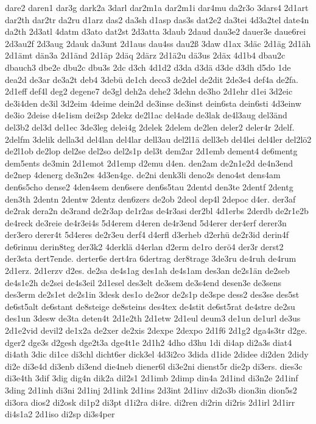{dare2
daren1
dar3g
dark2a
3darl
dar2m1a
dar2m1i
dar4mu
da2r3o
3dars4
2d1art
dar2th
dar2tr
da2ru
d1arz
das2
da3sh
d1asp
das3s
dat2e2
da3tei
4d3a2tel
date4n
da2th
2d3atl
4datm
d3ato
dat2st
2d3atta
3daub
2daud
dau3e2
dauer3e
daue6rei
2d3au2f
2d3aug
2dauk
da3unt
2d1aus
dau4ss
dau2ß
3daw
d1ax
3däc
2d1äg
2d1äh
2d1ämt
dän3a
2d1änd
2d1äp
2däq
2därz
2d1ä2u
dä3us
2däx
4d1b4
dbau2c
dbauch3
dbe2e
dbu2c
dbu3s
2dc
d3ch
4d1d2
d3da
d3dä
d3de
d3dh
d5do
1de
dea2d
de3ar
de3a2t
deb4
3debü
de1ch
deco3
de2del
de2dit
2de3e4
def4a
de2fa.
2d1eff
def4l
deg2
degene7
de3gl
deh2a
dehe2
3dehn
de3ho
2d1ehr
d1ei
3d2eic
de3i4den
de3il
3d2eim
4deime
dein2d
de3inse
de3inst
dein6sta
dein6sti
4d3einw
de3io
2deise
d4e1ism
dei2sp
2dekz
de2l1ac
del4ade
de3lak
de4l3aug
del3änd
del3b2
del3d
del1ec
3de3leg
delei4g
2delek
2delem
de2len
deler2
deler4r
2delf.
2delfm
3delik
della3d
del4lan
del4lar
dell3au
del2l1ä
dell3eb
del4lei
del4ler
del2lö2
de2l1ob
de2lop
del2se
del2so
del2s1p
del3t
dem2ar
2d1emb
dement4
de6mentg
dem5ents
de3min
2d1emot
2d1emp
d2emu
d4en.
den2am
de2n1e2d
de4n3end
de2nep
4denerg
de3n2es
4d3en4ge.
de2ni
denk3li
deno2s
deno4st
dens4am
den6s5cho
dense2
4den4sem
den6sere
den6s5tau
2dentd
den3te
2dentf
2dentg
den3th
2dentn
2dentw
2dentz
den6zers
de2ob
2deol
dep4l
2depoc
d4er.
der3af
de2rak
dera2n
de3rand
de2r3ap
de1r2as
de4r3asi
der2bl
4d1erbs
2derdb
de2r1e2b
de4reck
de3reie
de4r3ei4s
5d4erem
d4eren
de4r3end
5d4erer
der4erf
derer3n
der3ero
derer4t
5d4eres
de2r3eu
derf4
d4erfl
d3erheb
d2erhü
de2r3id
derin4f
de6rinnu
derin8teg
der3k2
4derklä
d4erlan
d2erm
de1ro
derö4
der3r
derst2
der3sta
dert7ende.
derter6e
dert4ra
6dertrag
der8trage
3de3ru
de4ruh
de4rum
2d1erz.
2d1erzv
d2es.
de2sa
de4s1ag
des1ah
de4s1am
des3an
de2s1än
de2seb
de4s1e2h
de2sei
de4s3eil
2d1esel
des3elt
de3sem
de3s4end
desen3e
de3sens
des3erm
de2s1et
de2s1in
3desk
des1o
de2sor
de2s1p
de3spe
dess2
des3se
des5st
de6st5alt
de6stant
de8steige
de8steins
des4tex
de4stit
de6st5rat
de4stre
de2su
des1un
3desw
de3ta
deten4t
2d1e2th
2d1etw
2d1eul
deum3
de1un
de1url
de3us
2d1e2vid
devil2
de1x2a
de2xer
de2xis
2dexpe
2dexpo
2d1f6
2d1g2
dga4s3tr
d2ge.
dger2
dge3s
d2gesh
dge2t3a
dge4t1e
2d1h2
4dho
d3hu
1di
di4ap
di2a3s
diat4
di4ath
3dic
di1ce
di3chl
dicht6er
dick3el
4d3i2co
3dida
d1ide
2didee
di2den
2didy
di2e
di3e4d
di3enb
di3end
die4neb
diener6l
di3e2ni
dienst5r
die2p
di3ers.
dies3c
di3e4th
3dif
3dig
dig4n
dik2a
dil2s1
2d1imb
2dimp
din4a
2d1ind
di3n2e
2d1inf
3ding
2d1inh
di3ni
2d1inj
2d1ink
2d1ins
2d3int
2d1inv
di2o3b
dion3in
dion5s2
di3ora
dios2
di2osk
di1p2
di3pt
d1i2ra
di4re.
di2ren
di2rin
di2ris
2d1irl
2d1irr
di4s1a2
2d1iso
di2sp
di3s4per
}
